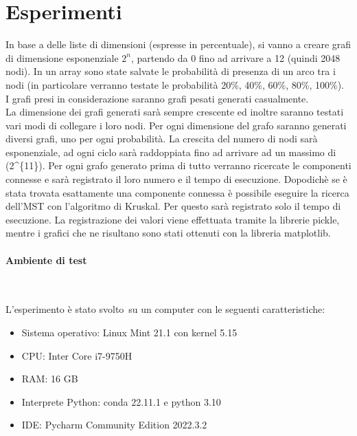 \documentclass[
]{article}
\begin{document}
\hypertarget{esperimenti}{%
\section{Esperimenti}\label{esperimenti}}

In base a delle liste di dimensioni (espresse in percentuale), si vanno
a creare grafi di dimensione esponenziale \(2^n\), partendo da 0 fino ad
arrivare a 12 (quindi 2048 nodi). In un array sono state salvate le
probabilità di presenza di un arco tra i nodi (in particolare verranno
testate le probabilità 20\%, 40\%, 60\%, 80\%, 100\%).\\
I grafi presi in considerazione saranno grafi pesati generati
casualmente.\\
La dimensione dei grafi generati sarà sempre crescente ed inoltre
saranno testati vari modi di collegare i loro nodi. Per ogni dimensione
del grafo saranno generati diversi grafi, uno per ogni probabilità. La
crescita del numero di nodi sarà esponenziale, ad ogni ciclo sarà
raddoppiata fino ad arrivare ad un massimo di (2\^{}\{11\}). Per ogni
grafo generato prima di tutto verranno ricercate le componenti connesse
e sarà registrato il loro numero e il tempo di esecuzione. Dopodichè se
è stata trovata esattamente una componente connessa è possibile eseguire
la ricerca dell'MST con l'algoritmo di Kruskal. Per questo sarà
registrato solo il tempo di esecuzione. La registrazione dei valori
viene effettuata tramite la librerie pickle, mentre i grafici che ne
risultano sono stati ottenuti con la libreria matplotlib.

\hypertarget{ambiente-di-test}{%
\paragraph{Ambiente di test}\label{ambiente-di-test}}

\

L'esperimento è stato svolto~su un computer con le seguenti caratteristiche:

\begin{itemize}
\item
  Sistema operativo: Linux Mint 21.1 con kernel 5.15
\item
  CPU: Inter Core i7-9750H
\item
  RAM: 16 GB
\item
  Interprete Python: conda 22.11.1 e python 3.10
\item
  IDE: Pycharm Community Edition 2022.3.2
\end{itemize}
\end{document}
